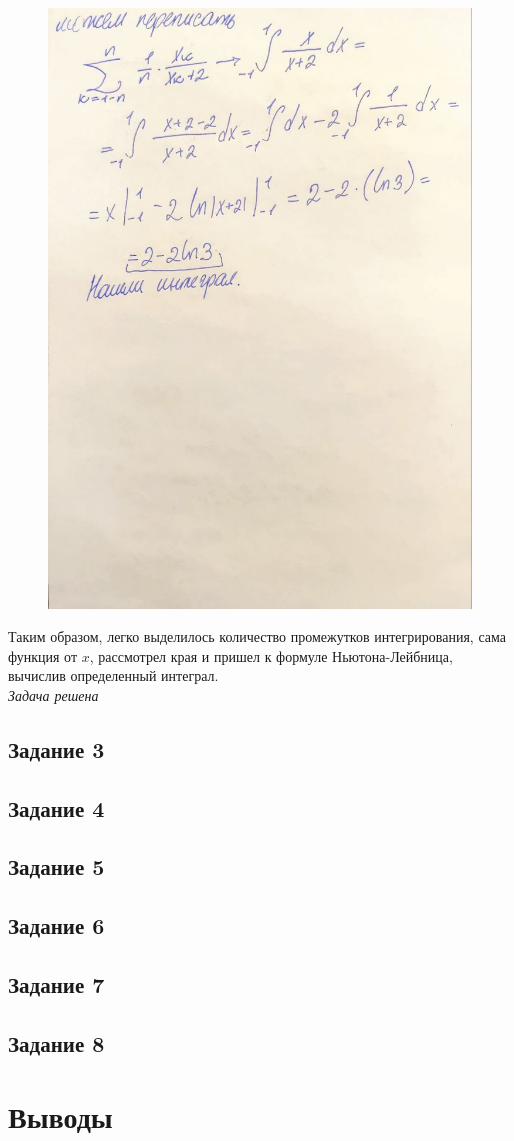 \documentclass[a4paper,12pt]{article}
\begin{document}
\begin{figure}[H]
    \centering
    \includegraphics[width=0.8\linewidth]{img/2_2.jpg}
    \caption{}
    \label{fig:part2}
\end{figure}

Таким образом, легко выделилось количество промежутков интегрирования, сама функция от $x$, рассмотрел края и пришел к формуле Ньютона-Лейбница, вычислив определенный интеграл.\\
\emph{Задача решена}


\subsection{Задание 3}


\subsection{Задание 4}


\subsection{Задание 5}


\subsection{Задание 6}


\subsection{Задание 7}


\subsection{Задание 8}


\section{Выводы}
\end{document}
